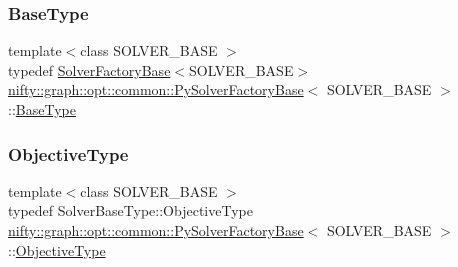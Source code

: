 \subsubsection{\texorpdfstring{Base\+Type}{BaseType}}
{\footnotesize\ttfamily template$<$class S\+O\+L\+V\+E\+R\+\_\+\+B\+A\+SE $>$ \\
typedef \hyperlink{classnifty_1_1graph_1_1opt_1_1common_1_1SolverFactoryBase}{Solver\+Factory\+Base}$<$S\+O\+L\+V\+E\+R\+\_\+\+B\+A\+SE$>$ \hyperlink{classnifty_1_1graph_1_1opt_1_1common_1_1PySolverFactoryBase}{nifty\+::graph\+::opt\+::common\+::\+Py\+Solver\+Factory\+Base}$<$ S\+O\+L\+V\+E\+R\+\_\+\+B\+A\+SE $>$\+::\hyperlink{classnifty_1_1graph_1_1opt_1_1common_1_1PySolverFactoryBase_abb618d7bbfb7624d95cfb118270cc3cd}{Base\+Type}}

\mbox{\label{classnifty_1_1graph_1_1opt_1_1common_1_1PySolverFactoryBase_a180b2e32de5993ef4c58de788dfaac82}} 
\subsubsection{\texorpdfstring{Objective\+Type}{ObjectiveType}}
{\footnotesize\ttfamily template$<$class S\+O\+L\+V\+E\+R\+\_\+\+B\+A\+SE $>$ \\
typedef Solver\+Base\+Type\+::\+Objective\+Type \hyperlink{classnifty_1_1graph_1_1opt_1_1common_1_1PySolverFactoryBase}{nifty\+::graph\+::opt\+::common\+::\+Py\+Solver\+Factory\+Base}$<$ S\+O\+L\+V\+E\+R\+\_\+\+B\+A\+SE $>$\+::\hyperlink{classnifty_1_1graph_1_1opt_1_1common_1_1SolverFactoryBase_ab71d93640cf3fbc0bc980450d5db6e45}{Objective\+Type}}

\mbox{\label{classnifty_1_1graph_1_1opt_1_1common_1_1PySolverFactoryBase_afeccce26248d50a8541e9644b96a2085}} 

